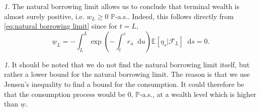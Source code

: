 \documentclass[11pt,oneside,english,reqno,dvipsnames,table]{amsart}
\numberwithin{equation}{section}
\theoremstyle{plain}
\theoremstyle{definition}
\theoremstyle{remark}
\newtheorem{rem}[thm]{\protect\remarkname}
\theoremstyle{plain}
\theoremstyle{plain}
\theoremstyle{plain}
\theoremstyle{plain}
\theoremstyle{plain}
\theoremstyle{plain}
\theoremstyle{plain}
\providecommand{\remarkname}{Remark}
\providecommand{\remarkname}{Remark}
\newcommand{\cF}{\mathcal{F}}
\newcommand{\EE}{\mathbb{E}}
\newcommand{\PP}{\mathbb{P}}
\newcommand{\dd}{\mathop{}\!\mathrm{d}}
\numberwithin{thm}{section}
\begin{document}
\begin{rem}
    The natural borrowing limit allows us to conclude that terminal wealth is almost surely positive, i.e.  $w_L\geq 0$ $\PP$-a.s.. Indeed, this follows directly from \eqref{eq:natural borrowing limit} since for $t=L$, 
\[
  \underline{w}_L=-\int_L^L \exp\left(-\int_t^s r_u \dd u\right)\EE[ \eta_s|\cF_L]\dd s=0.
\]
\end{rem}


\begin{rem}
    It should be noted that we do not find the natural borrowing limit itself, but rather a lower bound for the natural borrowing limit. The reason is that we use Jensen's inequality to find a bound for the consumption. It could therefore be that the consumption process would be 0, $\PP$-a.s.,  at a wealth level which is higher than $\underline{w}$. 
\end{rem}
\end{document}
